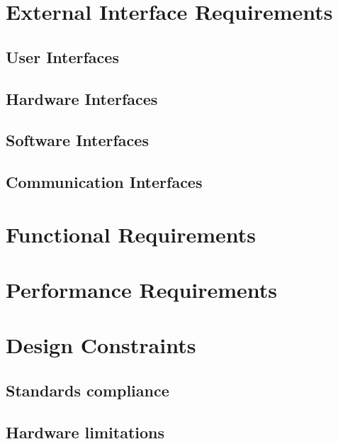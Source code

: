 \section{External Interface Requirements}
\label{sec:external_interface_requirements}%

\subsection{User Interfaces}
\label{subsec:user_interfaces}%

\subsection{Hardware Interfaces}
\label{subsec:hardware_interfaces}%

\subsection{Software Interfaces}
\label{subsec:software_interfaces}%

\subsection{Communication Interfaces}
\label{subsec:communication_interfaces}%


\section{Functional Requirements}
\label{sec:functional_requirements}%


\section{Performance Requirements}
\label{sec:performance_requirements}%


\section{Design Constraints}
\label{sec:design_constraints}%

\subsection{Standards compliance}
\label{subsec:standards_compliance}%

\subsection{Hardware limitations}
\label{subsec:hardware_limitations}%

